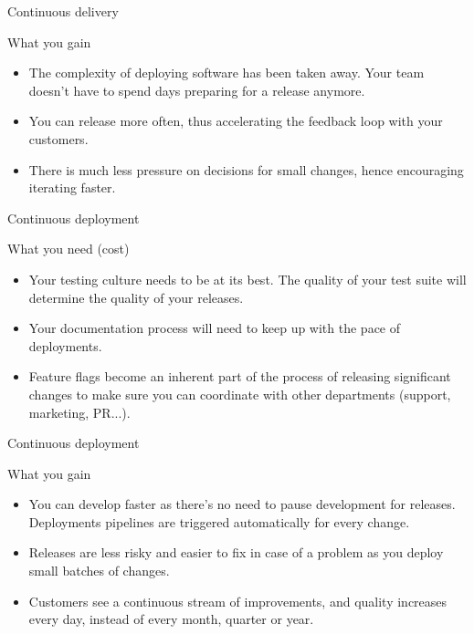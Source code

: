\documentclass{beamer}
\begin{document}
\begin{frame}{Continuous delivery}
	\begin{block}{What you gain}
	\begin{itemize}
		\item The complexity of deploying software has been taken away. Your team doesn't have to spend days preparing for a release anymore.
		\item You can release more often, thus accelerating the feedback loop with your customers.
		\item There is much less pressure on decisions for small changes, hence encouraging iterating faster.
	\end{itemize}
\end{block}

\end{frame}

\begin{frame}{Continuous deployment}
\begin{block}{What you need (cost)}
	\begin{itemize}
		\item Your testing culture needs to be at its best. The quality of your test suite will determine the quality of your releases.
		\item Your documentation process will need to keep up with the pace of deployments.
		\item Feature flags become an inherent part of the process of releasing significant changes to make sure you can coordinate with other departments (support, marketing, PR...).
	\end{itemize}
\end{block}
\end{frame}

\begin{frame}{Continuous deployment}
\begin{block}{What you gain}
	\begin{itemize}
		\item You can develop faster as there's no need to pause development for releases. Deployments pipelines are triggered automatically for every change.
		\item Releases are less risky and easier to fix in case of a problem as you deploy small batches of changes.
		\item Customers see a continuous stream of improvements, and quality increases every day, instead of every month, quarter or year.
	\end{itemize}
\end{block}
\end{frame}
\end{document}
